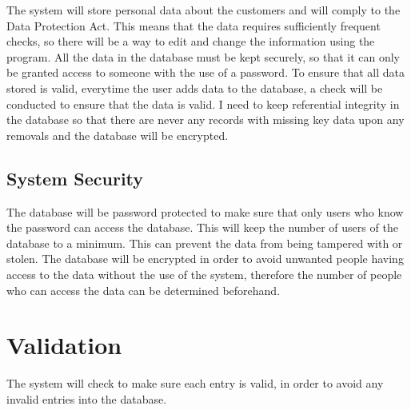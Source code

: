 The system will store personal data about the customers and will comply to the Data Protection Act. This means that the data requires sufficiently frequent checks, so there will be a way to edit and change the information using the program. All the data in the database must be kept securely, so that it can only be granted access to someone with the use of a password. To ensure that all data stored is valid, everytime the user adds data to the database, a check will be conducted to ensure that the data is valid. I need to keep referential integrity in the database so that there are never any records with missing key data upon any removals and the database will be encrypted.

\subsection{System Security}

The database will be password protected to make sure that only users who know the password can access the database. This will keep the number of users of the database to a minimum. This can prevent the data from being tampered with or stolen. The database will be encrypted in order to avoid unwanted people having access to the data without the use of the system, therefore the number of people who can access the data can be determined beforehand.
\section{Validation}

The system will check to make sure each entry is valid, in order to avoid any invalid entries into the database. 
 
